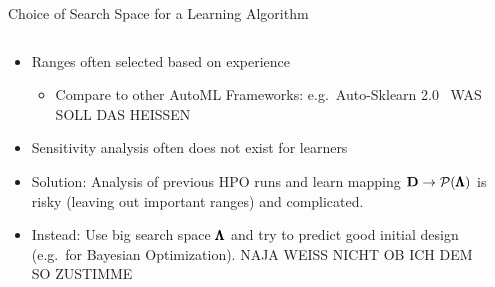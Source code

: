 \begin{frame}{Choice of Search Space for a Learning Algorithm}
  \begin{columns}
    \begin{column}{0.6\textwidth}
    \begin{itemize}
      \item Ranges often selected based on experience
      \begin{itemize}
        \item Compare to other AutoML Frameworks: e.g.\ Auto-Sklearn 2.0~
            WAS SOLL DAS HEISSEN
      \end{itemize}
      \item Sensitivity analysis often does not exist for learners
      \item Solution: Analysis of previous HPO runs and learn mapping $\mathbf{D} \rightarrow \mathcal{P}(\pmb{\Lambda})$ is risky (leaving out important ranges) and complicated.
      \item Instead: Use big search space $\pmb{\Lambda}$ and try to predict good initial design (e.g.\ for Bayesian Optimization).
          NAJA WEISS NICHT OB ICH DEM SO ZUSTIMME
    \end{itemize}
    \end{column}%
    \begin{column}{0.4\textwidth}
      \begin{center}
\end{center}
\end{column}
\end{columns}
\end{frame}
